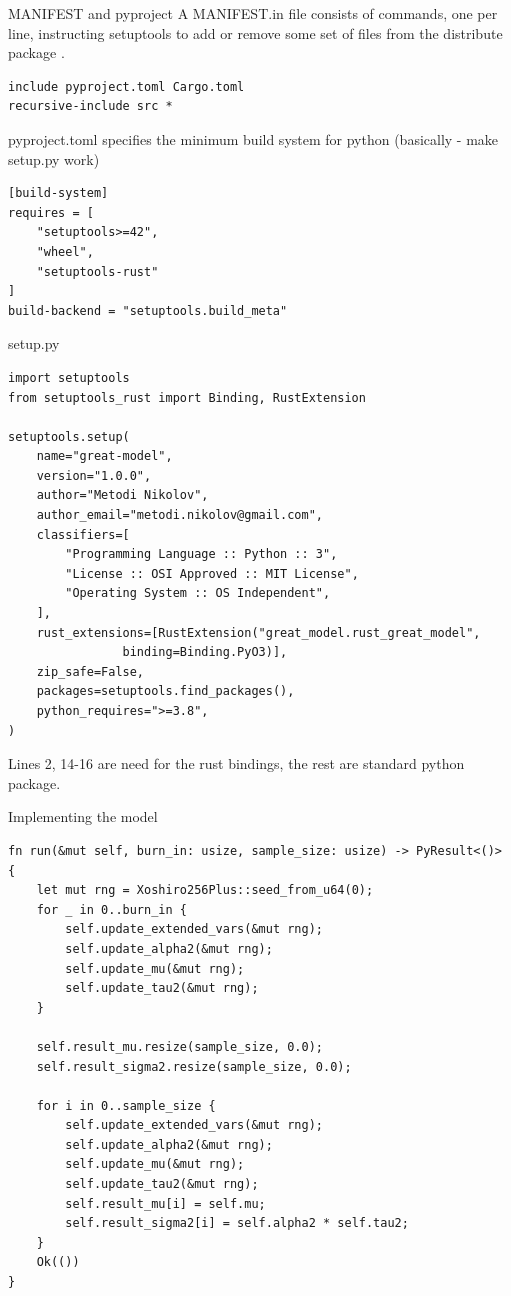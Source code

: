 \documentclass[8pt]{beamer}
\begin{document}
\begin{frame}[fragile]{MANIFEST and pyproject}
A MANIFEST.in file consists of commands, one per line, instructing setuptools to add or remove some set of files from the distribute package .
\begin{verbatim}
include pyproject.toml Cargo.toml
recursive-include src *
\end{verbatim}

pyproject.toml specifies the minimum build system for python (basically - make setup.py work)
\begin{verbatim}
[build-system]
requires = [
	"setuptools>=42",
	"wheel",
	"setuptools-rust"
]
build-backend = "setuptools.build_meta"
\end{verbatim}
\end{frame}

\begin{frame}[fragile]{setup.py}
\begin{verbatim}
import setuptools
from setuptools_rust import Binding, RustExtension

setuptools.setup(
	name="great-model",
	version="1.0.0",
	author="Metodi Nikolov",
	author_email="metodi.nikolov@gmail.com",
	classifiers=[
		"Programming Language :: Python :: 3",
		"License :: OSI Approved :: MIT License",
		"Operating System :: OS Independent",
	],
	rust_extensions=[RustExtension("great_model.rust_great_model", 
				binding=Binding.PyO3)],
	zip_safe=False,
	packages=setuptools.find_packages(),
	python_requires=">=3.8",
)
\end{verbatim}
Lines 2, 14-16 are need for the rust bindings, the rest are standard python package.
\end{frame}

\begin{frame}[fragile]{Implementing the model}
\begin{verbatim}
fn run(&mut self, burn_in: usize, sample_size: usize) -> PyResult<()> {
	let mut rng = Xoshiro256Plus::seed_from_u64(0);
	for _ in 0..burn_in {
		self.update_extended_vars(&mut rng);
		self.update_alpha2(&mut rng);
		self.update_mu(&mut rng);
		self.update_tau2(&mut rng);
	}

	self.result_mu.resize(sample_size, 0.0);
	self.result_sigma2.resize(sample_size, 0.0);
	
	for i in 0..sample_size {
		self.update_extended_vars(&mut rng);
		self.update_alpha2(&mut rng);
		self.update_mu(&mut rng);
		self.update_tau2(&mut rng);
		self.result_mu[i] = self.mu;
		self.result_sigma2[i] = self.alpha2 * self.tau2;
	}
	Ok(())
}
\end{verbatim}
\end{frame}
\end{document}
